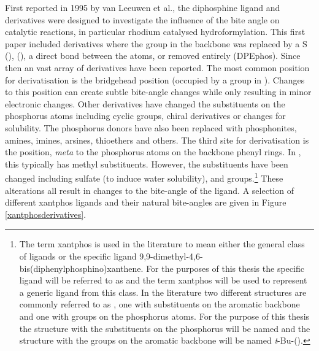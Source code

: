First reported in 1995 by van Leeuwen et al.,\cite{Kranenburg1995} the diphosphine ligand \Phxantphos{} and derivatives were designed to investigate the influence of the bite angle on catalytic reactions, in particular rhodium catalysed hydroformylation.  This first paper included derivatives where the  group in the backbone was replaced by a S (\Phthixantphos),  (\Phsixantphos), a direct bond between the atoms, or removed entirely (DPEphos).  Since then an vast array of derivatives have been reported.  The most common position for derivatisation is the bridgehead position (occupied by a  group in \Phxantphos{}).  Changes to this position can create subtle bite-angle changes while only resulting in minor electronic changes. Other derivatives have changed the substituents on the phosphorus atoms including cyclic groups, chiral derivatives or changes for solubility.  The phosphorus donors have also been replaced with phosphonites, amines, imines, arsines, thioethers and others.  The third site for derivatisation is the position, \emph{meta} to the phosphorus atoms on the backbone phenyl rings.  In \Phthixantphos, this typically has methyl substituents.  However, the substituents have been changed including sulfate (to induce water solubility), and \tBu{} groups.\footnote{The term xantphos is used in the literature to mean either the general class of ligands or the specific ligand 9,9-dimethyl-4,6-bis(diphenylphosphino)xanthene.  For the purposes of this thesis the specific ligand will be referred to as \Phxantphos{} and the term xantphos will be used to represent a generic ligand from this class.  In the literature two different structures are commonly referred to as  \tBuxantphos{}, one with \tBu{} substituents on the aromatic backbone and one with \tBu{} groups on the phosphorus atoms.  For the purpose of this thesis the structure with the \tBu{} substituents on the phosphorus will be named \tBuxantphos{} and the structure with the \tBu{} groups on the aromatic backbone will be named \emph{t}-Bu-(\Phxantphos).}  These alterations all result in changes to the bite-angle of the ligand.  A selection of different xantphos ligands and their natural bite-angles are given in Figure \ref{xantphosderivatives}.


